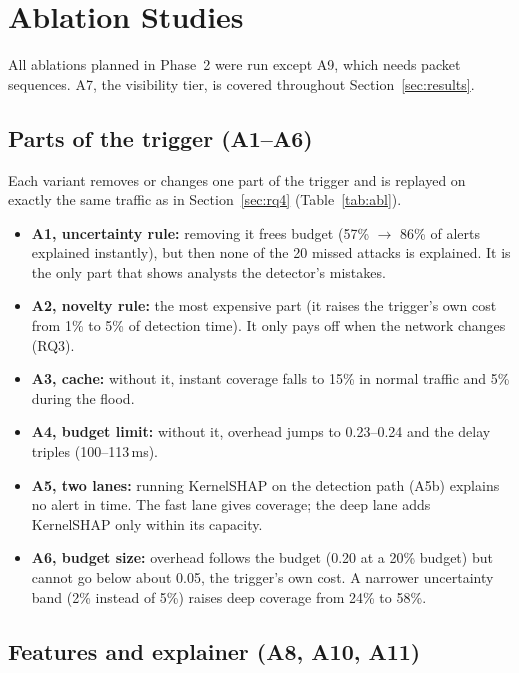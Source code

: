 \section{Ablation Studies}
\label{sec:ablation}
All ablations planned in Phase~2 were run except A9, which needs packet sequences. A7, the visibility tier, is covered throughout Section~\ref{sec:results}.

\subsection{Parts of the trigger (A1--A6)}
\label{sec:abl:trigger}
Each variant removes or changes one part of the trigger and is replayed on exactly the same traffic as in Section~\ref{sec:rq4} (Table~\ref{tab:abl}).



\begin{itemize}[leftmargin=*, itemsep=0pt]
  \item \textbf{A1, uncertainty rule:} removing it frees budget (57\% $\rightarrow$ 86\% of alerts explained instantly), but then none of the 20 missed attacks is explained. It is the only part that shows analysts the detector's mistakes.
  \item \textbf{A2, novelty rule:} the most expensive part (it raises the trigger's own cost from 1\% to 5\% of detection time). It only pays off when the network changes (RQ3).
  \item \textbf{A3, cache:} without it, instant coverage falls to 15\% in normal traffic and 5\% during the flood.
  \item \textbf{A4, budget limit:} without it, overhead jumps to 0.23--0.24 and the delay triples (100--113\,ms).
  \item \textbf{A5, two lanes:} running KernelSHAP on the detection path (A5b) explains no alert in time. The fast lane gives coverage; the deep lane adds KernelSHAP only within its capacity.
  \item \textbf{A6, budget size:} overhead follows the budget (0.20 at a 20\% budget) but cannot go below about 0.05, the trigger's own cost. A narrower uncertainty band (2\% instead of 5\%) raises deep coverage from 24\% to 58\%.
\end{itemize}

\subsection{Features and explainer (A8, A10, A11)}
\label{sec:abl:repr}


